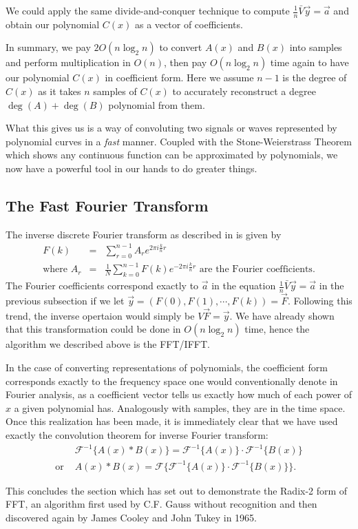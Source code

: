 \documentclass[../article.tex]{subfiles}
\begin{document}
We could apply the same divide-and-conquer technique to compute $\frac{1}{n}\bar{V}\vec{y} = \vec{a}$ and obtain our polynomial $C(x)$ as a vector of coefficients.

In summary, we pay $2O(n\log_2{n})$ to convert $A(x)$ and $B(x)$ into samples and perform multiplication in $O(n)$, then pay $O(n\log_2{n})$ time again to have our polynomial $C(x)$ in coefficient form. Here we assume $n-1$ is the degree of $C(x)$ as it takes $n$ samples of $C(x)$ to accurately reconstruct a degree $\deg(A)+\deg(B)$ polynomial from them.

What this gives us is a way of convoluting two signals or waves represented by polynomial curves in a \emph{fast} manner. Coupled with the Stone-Weierstrass Theorem which shows any continuous function can be approximated by polynomials, we now have a powerful tool in our hands to do greater things.

\subsection{The Fast Fourier Transform}


The inverse discrete Fourier transform as described in \cite{text} is given by
\begin{eqnarray*}
	F(k) &=& \displaystyle \sum_{r=0}^{n-1} A_r e^{2\pi i\frac{k}{n}r}\\
	\text{where } A_r &=& \frac{1}{N} \displaystyle \sum_{k=0}^{n-1} F(k) e^{-2\pi i\frac{k}{n}r} \text{ are the Fourier coefficients}.
\end{eqnarray*}
The Fourier coefficients correspond exactly to $\vec{a}$ in the equation $\frac{1}{n}\bar{V}\vec{y}=\vec{a}$ in the previous subsection if we let $\vec{y} = (F(0),F(1),\cdots,F(k)) = \vec{F}$. Following this trend, the inverse opertaion would simply be $V\vec{F} = \vec{y}$. We have already shown that this transformation could be done in $O(n\log_2n)$ time, hence the algorithm we described above is the FFT/IFFT.

In the case of converting representations of polynomials, the coefficient form corresponds exactly to the frequency space one would conventionally denote in Fourier analysis, as a coefficient vector tells us exactly how much of each power of $x$ a given polynomial has. Analogously with samples, they are in the time space. Once this realization has been made, it is immediately clear that we have used exactly the convolution theorem for inverse Fourier transform:
\begin{eqnarray*}
&\mathscr{F}^{-1}\{A(x)*B(x)\} =\mathscr{F}^{-1}\{A(x)\}\cdot\mathscr{F}^{-1}\{B(x)\}\\
\text{or } &A(x)*B(x) =\mathscr{F}\{\mathscr{F}^{-1}\{A(x)\}\cdot\mathscr{F}^{-1}\{B(x)\}\}.
\end{eqnarray*}

This concludes the section which has set out to demonstrate the Radix-2 form of FFT, an algorithm first used by C.F. Gauss without recognition and then discovered again by James Cooley and John Tukey in 1965.
\end{document}
